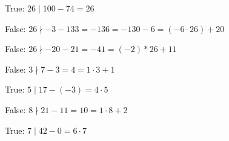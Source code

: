 
  \begin{myenum}
    \item True: $26 \mid 100 - 74 = 26$
    \item False: $26 \nmid -3 - 133 = -136 = -130 - 6 = (-6 \cdot 26) + 20$
    \item False: $26 \nmid -20 - 21 = -41 =  (-2) * 26 + 11$
    \item False: $3 \nmid 7 - 3 = 4 = 1 \cdot 3 + 1$
    \item True: $5 \mid 17 - (-3) =  4 \cdot 5$
    \item False: $8 \nmid 21 - 11 = 10 = 1 \cdot 8 + 2$
    \item True: $7 \mid 42 - 0 = 6 \cdot 7$
  \end{myenum}

    
